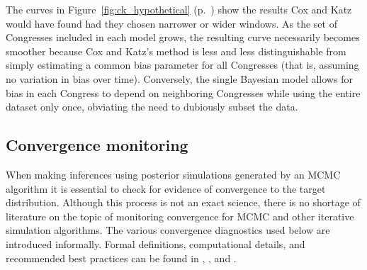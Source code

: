 The curves in Figure~\ref{fig:ck_hypothetical} (p.~\pageref{fig:ck_hypothetical}) show the results Cox and Katz would have found had they chosen narrower or wider windows. As the set of Congresses included in each model grows, the resulting curve necessarily becomes smoother because Cox and Katz's method is less and less distinguishable from simply estimating a common bias parameter for all Congresses (that is, assuming no variation in bias over time). Conversely, the single Bayesian model allows for bias in each Congress to depend on neighboring Congresses while using the entire dataset only once, obviating the need to dubiously subset the data. 

\subsection{Convergence monitoring}
\label{subsection_convergence}

When making inferences using posterior simulations generated by an MCMC algorithm it is essential to check for evidence of convergence to the target distribution. Although this process is not an exact science, there is no shortage of literature on the topic of monitoring convergence for MCMC and other iterative simulation algorithms. The various convergence diagnostics used below are introduced informally. Formal definitions, computational details, and recommended best practices can be found in , , and .



